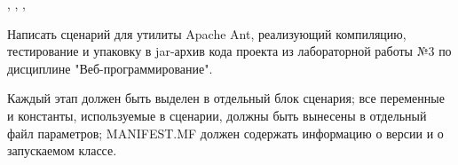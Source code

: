 


\tableofcontents


\newpage
\Chapter{\lab\ \labnumber}{\labtheme}{}

\begin{center}
, , ,
\end{center}
Написать сценарий для утилиты Apache Ant, реализующий компиляцию, тестирование и упаковку в jar-архив кода проекта из лабораторной работы №3 по дисциплине "Веб-программирование".

Каждый этап должен быть выделен в отдельный блок сценария; все переменные и константы, используемые в сценарии, должны быть вынесены в отдельный файл параметров; MANIFEST.MF должен содержать информацию о версии и о запускаемом классе.

